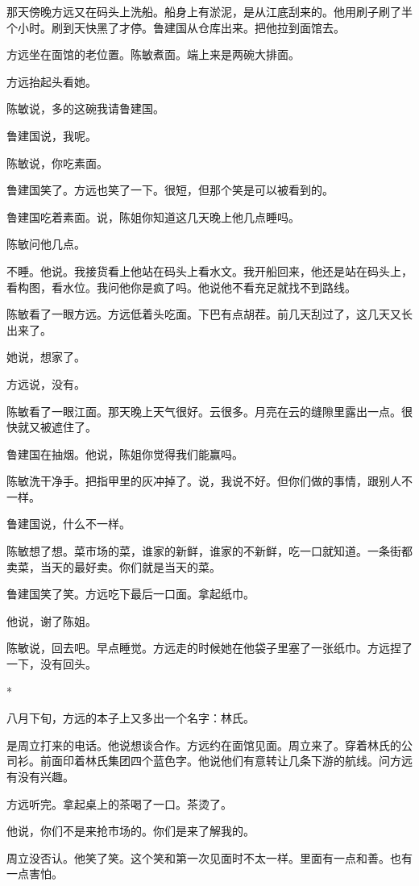 \documentclass[UTF8,a5paper,11pt,openany]{ctexbook}
\newcommand{\scene}{\vspace{1em}\begin{center}*\quad*\quad*\end{center}\vspace{0.5em}}
\begin{document}
那天傍晚方远又在码头上洗船。船身上有淤泥，是从江底刮来的。他用刷子刷了半个小时。刷到天快黑了才停。鲁建国从仓库出来。把他拉到面馆去。

方远坐在面馆的老位置。陈敏煮面。端上来是两碗大排面。

方远抬起头看她。

陈敏说，多的这碗我请鲁建国。

鲁建国说，我呢。

陈敏说，你吃素面。

鲁建国笑了。方远也笑了一下。很短，但那个笑是可以被看到的。

鲁建国吃着素面。说，陈姐你知道这几天晚上他几点睡吗。

陈敏问他几点。

不睡。他说。我接货看上他站在码头上看水文。我开船回来，他还是站在码头上，看构图，看水位。我问他你是疯了吗。他说他不看充足就找不到路线。

陈敏看了一眼方远。方远低着头吃面。下巴有点胡茬。前几天刮过了，这几天又长出来了。

她说，想家了。

方远说，没有。

陈敏看了一眼江面。那天晚上天气很好。云很多。月亮在云的缝隙里露出一点。很快就又被遮住了。

鲁建国在抽烟。他说，陈姐你觉得我们能赢吗。

陈敏洗干净手。把指甲里的灰冲掉了。说，我说不好。但你们做的事情，跟别人不一样。

鲁建国说，什么不一样。

陈敏想了想。菜市场的菜，谁家的新鲜，谁家的不新鲜，吃一口就知道。一条街都卖菜，当天的最好卖。你们就是当天的菜。

鲁建国笑了笑。方远吃下最后一口面。拿起纸巾。

他说，谢了陈姐。

陈敏说，回去吧。早点睡觉。方远走的时候她在他袋子里塞了一张纸巾。方远捏了一下，没有回头。


\scene

八月下旬，方远的本子上又多出一个名字：林氏。

是周立打来的电话。他说想谈合作。方远约在面馆见面。周立来了。穿着林氏的公司衫。前面印着林氏集团四个蓝色字。他说他们有意转让几条下游的航线。问方远有没有兴趣。

方远听完。拿起桌上的茶喝了一口。茶烫了。

他说，你们不是来抢市场的。你们是来了解我的。

周立没否认。他笑了笑。这个笑和第一次见面时不太一样。里面有一点和善。也有一点害怕。
\end{document}
